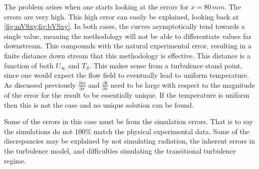 \documentclass[preprint,12pt]{elsarticle}
\begin{document}
The problem arises when one starts looking at the errors for $x=80\, mm$.  The errors are very high.  This high error can easily be explained, looking back at \cref{fig:mVSxy,fig:bVSxy}.  In both cases, the curves asymptotically tend towards a single value, meaning the methodology will not be able to differentiate values far downstream.  This compounds with the natural experimental error, resulting in a finite distance down stream that this methodology is effective.  This distance is a function of both $U_{\infty}$ and $T_S$.  This makes sense from a turbulence stand point, since one would expect the flow field to eventually lead to uniform temperature.  As discussed previously $\frac{\partial m}{\partial x}$ and $\frac{\partial b}{\partial x}$ need to be large with respect to the magnitude of the error for the result to be essentially unique.  If the temperature is uniform then this is not the case and no unique solution can be found.

Some of the errors in this case must be from the simulation errors.  That is to say the simulations do not $100\%$ match the physical experimental data.  Some of the discrepancies may be explained by not simulating radiation, the inherent errors in the turbulence model, and difficulties simulating the transitional turbulence regime.
\end{document}
